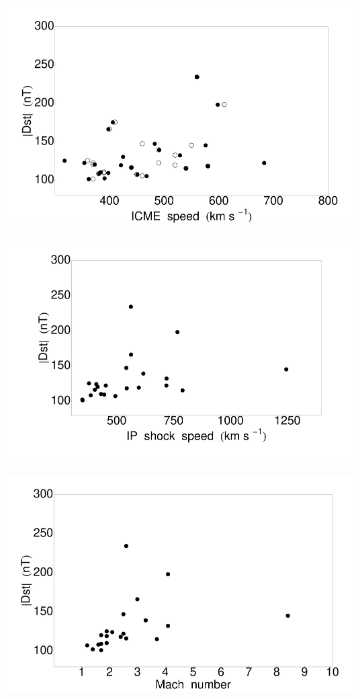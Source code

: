 \begin{figure}[!htp]
	\centering
	\begin{subfigure}[b]{0.45\textwidth}
		\includegraphics[width=\textwidth]{chapter2/figs/Fig_GS_ICMEspeed.pdf}
	\end{subfigure}
	\hfill
	\begin{subfigure}[b]{0.45\textwidth}
		\includegraphics[width=\textwidth]{chapter2/figs/Fig_GS_IPspeed.pdf}
	\end{subfigure}
	\begin{subfigure}[b]{0.45\textwidth}
		\includegraphics[width=\textwidth]{chapter2/figs/Fig_GS_Ms.pdf}

\end{subfigure}
\end{figure}
